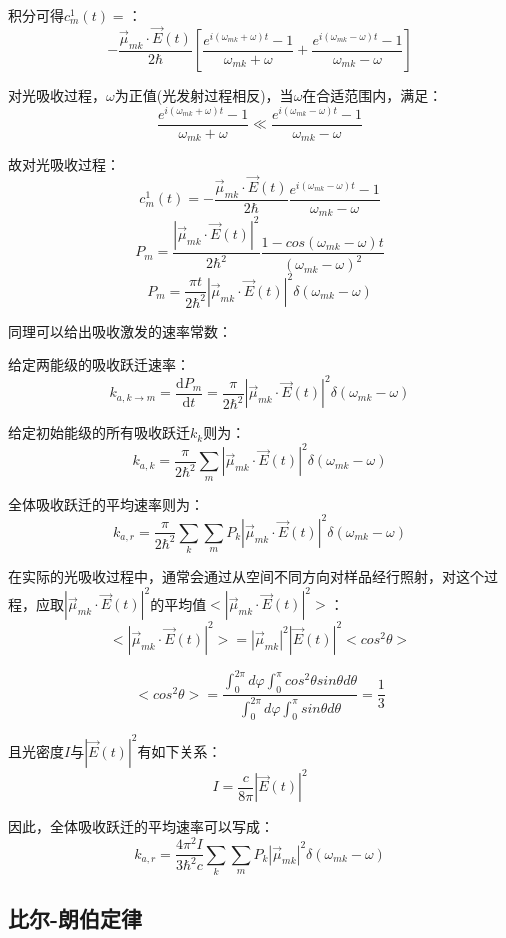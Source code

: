 积分可得$c_m^1(t)=$：
\[-\frac{\overrightarrow{\mu}_{mk} \cdot \overrightarrow{E}(t)}{2 \hbar}\left [\frac{e^{i(\omega_{mk}+\omega)t}-1}{\omega_{mk}+\omega}+\frac{e^{i(\omega_{mk}-\omega)t}-1}{\omega_{mk}-\omega} \right ]\]

对光吸收过程，$\omega$为正值(光发射过程相反)，当$\omega$在合适范围内，满足：
\[\frac{e^{i(\omega_{mk}+\omega)t}-1}{\omega_{mk} + \omega} \ll \frac{e^{i(\omega_{mk}-\omega)t}-1}{\omega_{mk}-\omega}\]

故对光吸收过程：
\[c_m^1(t)=-\frac{\overrightarrow{\mu}_{mk} \cdot \overrightarrow{E}(t)}{2 \hbar}\frac{e^{i(\omega_{mk}-\omega)t}-1}{\omega_{mk}-\omega}\]
\[P_m=\frac{|\overrightarrow{\mu}_{mk} \cdot \overrightarrow{E}(t)|^2}{2 \hbar^2}\frac{1-cos(\omega_{mk}-\omega)t}{(\omega_{mk}-\omega)^2}\]
\[P_m=\frac{\pi t}{2 \hbar^2}|\overrightarrow{\mu}_{mk} \cdot \overrightarrow{E}(t)|^2 \delta(\omega_{mk}-\omega)\]

同理可以给出吸收激发的速率常数：

给定两能级的吸收跃迁速率：
\[k_{a,k \rightarrow m}=\frac{\mathrm{d} P_m}{\mathrm{d}t}=\frac{\pi}{2 \hbar^2}|\overrightarrow{\mu}_{mk} \cdot \overrightarrow{E}(t)|^2 \delta(\omega_{mk}-\omega)\]

给定初始能级的所有吸收跃迁$k_{k}$则为：
\[k_{a,k}=\frac{\pi}{2 \hbar^2}\sum_m|\overrightarrow{\mu}_{mk} \cdot \overrightarrow{E}(t)|^2 \delta(\omega_{mk}-\omega)\]

全体吸收跃迁的平均速率则为：
\[k_{a,r}=\frac{\pi}{2 \hbar^2}\sum_k\sum_m P_k |\overrightarrow{\mu}_{mk} \cdot \overrightarrow{E}(t)|^2 \delta(\omega_{mk}-\omega)\]

在实际的光吸收过程中，通常会通过从空间不同方向对样品经行照射，对这个过程，应取$|\overrightarrow{\mu}_{mk} \cdot \overrightarrow{E}(t)|^2$的平均值$<|\overrightarrow{\mu}_{mk} \cdot \overrightarrow{E}(t)|^2>$：
\[<|\overrightarrow{\mu}_{mk} \cdot \overrightarrow{E}(t)|^2>=|\overrightarrow{\mu}_{mk}|^2|\overrightarrow{E}(t)|^2<cos^2 \theta>\]

\[<cos^2 \theta>=\frac{\int_0^{2\pi}d\varphi \int_0^{\pi}cos^2 \theta sin \theta d\theta}{\int_0^{2\pi}d\varphi \int_0^{\pi} sin \theta d\theta}=\frac{1}{3}\]

且光密度$I$与$|\overrightarrow{E}(t)|^2$有如下关系：
\[I=\frac{c}{8 \pi}|\overrightarrow{E}(t)|^2\]

因此，全体吸收跃迁的平均速率可以写成：
\[k_{a,r}=\frac{4\pi^2 I}{3 \hbar^2c}\sum_k\sum_m P_k |\overrightarrow{\mu}_{mk}|^2 \delta(\omega_{mk}-\omega)\]

\subsection{比尔-朗伯定律}

